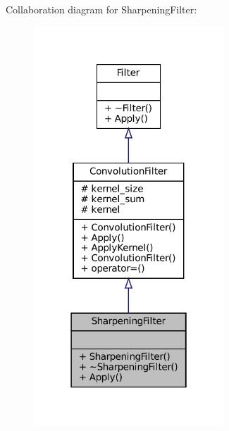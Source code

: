 Collaboration diagram for Sharpening\+Filter\+:\nopagebreak
\begin{figure}[H]
\begin{center}
\leavevmode
\includegraphics[width=202pt]{classSharpeningFilter__coll__graph}
\end{center}
\end{figure}
